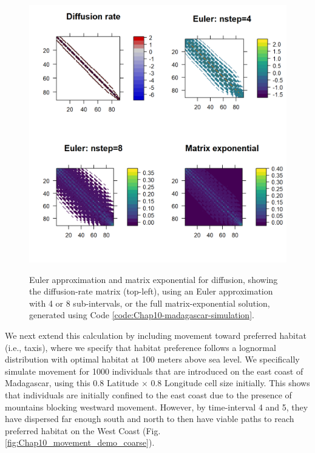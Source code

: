 \lstset{style=Rcode}
 

\begin{figure}[!ht]
    \caption[Euler approximation and matrix exponential for diffusion]{Euler approximation and matrix exponential for diffusion, showing the diffusion-rate matrix (top-left), using an Euler approximation with 4 or 8 sub-intervals, or the full matrix-exponential solution, generated using Code \ref{code:Chap10-madagascar-simulation}.}
    \includegraphics[width=5.5in]{Chap_10/euler_cellsize08.png}
    \label{fig:Chap10_Euler_matrices}
\end{figure}

We next extend this calculation by including movement toward preferred habitat (i.e., taxis), where we specify that habitat preference follows a lognormal distribution with optimal habitat at 100 meters above sea level.  We specifically simulate movement for 1000 individuals that are introduced on the east coast of Madagascar, using this 0.8 Latitude \(\times\) 0.8 Longitude cell size initially. This shows that individuals are initially confined to the east coast due to the presence of mountains blocking westward movement.  However, by time-interval 4 and 5, they have dispersed far enough south and north to then have viable paths to reach preferred habitat on the West Coast (Fig. \ref{fig:Chap10_movement_demo_coarse}).   

